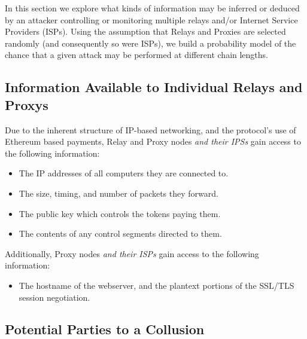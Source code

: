 

In this section we explore what kinds of information may be inferred
or deduced by an attacker controlling or monitoring multiple relays
and/or Internet Service Providers (ISPs). Using the assumption that
Relays and Proxies are selected randomly (and consequently so were
ISPs), we build a probability model of the chance that a given attack
may be performed at different chain lengths.

\subsection{Information Available to Individual Relays and Proxys}
\label{relay-proxy-info-known}

Due to the inherent structure of IP-based networking, and the
\Orchid{} protocol's use of Ethereum based payments, Relay and Proxy
nodes \emph{and their IPSs} gain access to the following information:

\begin{itemize}
\item The IP addresses of all computers they are connected to.
\item The size, timing, and number of packets they forward.
\item The public key which controls the tokens paying them.
\item The contents of any control segments directed to them.
\end{itemize}

Additionally, Proxy nodes \emph{and their ISPs} gain access to the
following information:

\begin{itemize}
\item The hostname of the webserver, and the plantext portions of the
  SSL/TLS session negotiation.
\end{itemize}

\subsection{Potential Parties to a Collusion}
\label{sec:collusion}

